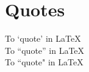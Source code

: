 \documentclass[a4paper,12pt]{article}
\begin{document}
	\section*{Quotes}
	To `quote' in \LaTeX\ \\
	To ``quote'' in \LaTeX\ \\
	To ``quote" in \LaTeX\
		
\end{document}
